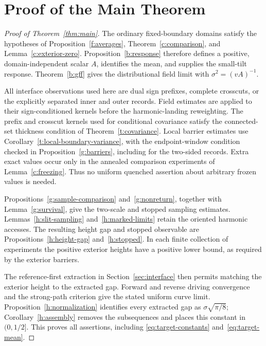 \documentclass[11pt]{article}
\theoremstyle{definition}
\theoremstyle{remark}
\numberwithin{equation}{section}
\begin{document}
\section{Proof of the Main Theorem}\label{sec:assembly}
\begin{proof}[Proof of Theorem~\ref{thm:main}]
The ordinary fixed-boundary domains satisfy the hypotheses of
Proposition~\ref{f:averages}, Theorem~\ref{c:comparison}, and
Lemma~\ref{c:exterior-zero}. Proposition~\ref{b:response} therefore
defines a positive, domain-independent scalar $A$, identifies the mean,
and supplies the small-tilt response. Theorem~\ref{b:gff} gives the
distributional field limit with $\sigma^2=(vA)^{-1}$.

All interface observations used here are dual sign prefixes, complete
crosscuts, or the explicitly separated inner and outer records.
Field estimates are applied to their sign-conditioned kernels before
the harmonic-landing reweighting. The prefix and crosscut kernels
used for conditional covariance satisfy the connected-set thickness
condition of Theorem~\ref{t:covariance}. Local barrier estimates use
Corollary~\ref{t:local-boundary-variance}, with the endpoint-window
condition checked in Proposition~\ref{g:barriers}, including for the
two-sided records. Extra exact values occur only in the annealed
comparison experiments of Lemma~\ref{c:freezing}. Thus no uniform
quenched assertion about arbitrary frozen values is needed.

Propositions~\ref{g:sample-comparison} and~\ref{g:nonreturn}, together
with Lemma~\ref{g:survival}, give the two-scale and stopped sampling
estimates. Lemmas~\ref{h:slit-sampling} and~\ref{h:marked-limits}
retain the oriented harmonic accesses. The resulting height gap and
stopped observable are Propositions~\ref{h:height-gap} and~\ref{h:stopped}.
In each finite collection of experiments the positive exterior heights
have a positive lower bound, as required by the exterior barriers.

The reference-first extraction in Section~\ref{sec:interface} then
permits matching the exterior height to the extracted gap. Forward
and reverse driving convergence and the strong-path criterion give
the stated uniform curve limit. Proposition~\ref{h:normalization}
identifies every extracted gap as $\sigma\sqrt{\pi/8}$;
Corollary~\ref{h:assembly} removes the subsequences and places this
constant in $(0,1/2]$. This proves all assertions, including
\eqref{eq:target-constants} and~\eqref{eq:target-mean}.
\end{proof}
\end{document}
